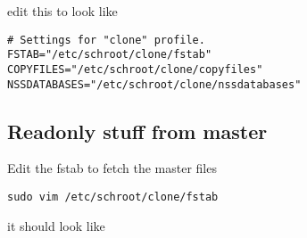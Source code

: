 \documentclass[a4paper]{book}
\begin{document}
edit this to look like

\begin{verbatim}
# Settings for "clone" profile.
FSTAB="/etc/schroot/clone/fstab"
COPYFILES="/etc/schroot/clone/copyfiles"
NSSDATABASES="/etc/schroot/clone/nssdatabases"
\end{verbatim}

\subsection{Readonly stuff from master}

Edit the fstab to fetch the master files

\begin{verbatim}
sudo vim /etc/schroot/clone/fstab
\end{verbatim}

it should look like
\end{document}
